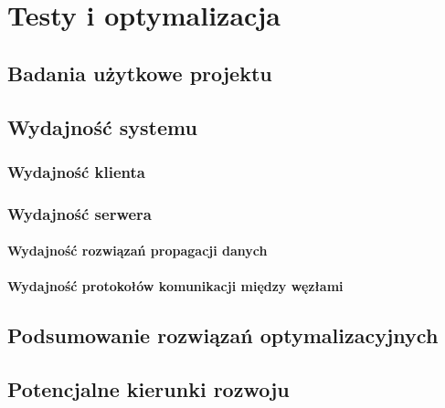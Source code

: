 \chapter{Testy i optymalizacja}
\label{cha:testyIOptymalizacje}

\section{Badania użytkowe projektu}
\label{sec:badaniaUX}

\section{Wydajność systemu}
\label{sec:wydajnosc}

\subsection{Wydajność klienta}
\label{sec:wydajnoscKlient}

\subsection{Wydajność serwera}
\label{sec:wydajnoscNode}

\subsubsection{Wydajność rozwiązań propagacji danych}
\subsubsection{Wydajność protokołów komunikacji między węzłami}

\section{Podsumowanie rozwiązań optymalizacyjnych}
\label{sec:optSummary}

\section{Potencjalne kierunki rozwoju}
\label{sec:future}